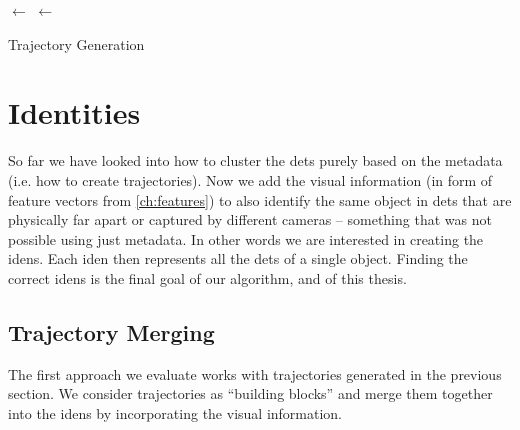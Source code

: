 \begin{algorithm}

 
 \BlankLine
 \Traj $\leftarrow$ \UnionFind{ }\;
 \Win $\leftarrow$ \Queue{ }\;
 \Return \Traj

 \caption{Trajectory Generation}
 \label{alg:trajectory_generation}
\end{algorithm}

\section{Identities}

\label{sec:generating_identities}

So far we have looked into how to cluster the \glspl{det} purely based on the metadata (i.e. how to create trajectories). Now we add the visual information (in form of feature vectors from \autoref{ch:features}) to also identify the same object in \glspl{det} that are physically far apart or captured by different cameras -- something that was not possible using just metadata. In other words we are interested in creating the \glspl{iden}. Each \gls{iden} then represents all the \glspl{det} of a single object. Finding the correct \glspl{iden} is the final goal of our algorithm, and of this thesis.

\subsection{Trajectory Merging}

The first approach we evaluate works with trajectories generated in the previous section. We consider trajectories as ``building blocks'' and merge them together into the \glspl{iden} by incorporating the visual information.

